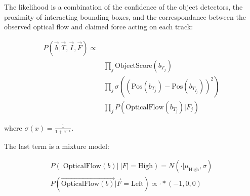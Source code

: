 \documentclass{article}
\begin{document}
The likelihood is a combination of the confidence of the object detectors, the proximity of interacting bounding boxes, and the correspondance between the observed optical flow and claimed force acting on each track:

\begin{equation}
  \begin{split}
  P(\vec{b}|\vec{T},\vec{I},\vec{F})\propto\\
  &\prod_j {\text{ObjectScore}(b_{T_j})}\\
  &\prod_j {\sigma((\text{Pos}(b_{T_j})-\text{Pos}(b_{T_{I_j}}))^2)}\\
  &\prod_j P(\text{OpticalFlow}(b_{T_j})|F_j)
\end{split}
\end{equation}

where $\sigma(x)=\frac{1}{1+e^{-x}}$.

The last term is a mixture model:

\begin{gather}
  P(|\text{OpticalFlow}(b)|\ |F|=\text{High}) = N(\cdot|\mu_{\text{High}}, \sigma)\\
  P(\vec{\text{OpticalFlow}(b)}| \vec{F}=\text{Left}) \propto \cdot * (-1, 0, 0)
\end{gather}
\end{document}
